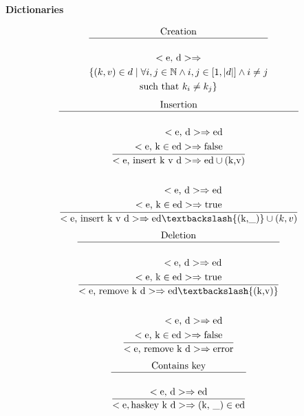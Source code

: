 \documentclass[a4paper, 10pt]{article}
\newcommand{\te}[1]{\text{#1}}
\def\N{\mathbb{N}}
\DeclarePairedDelimiter\abs{\lvert}{\rvert}
\theoremstyle{plain}%
\theoremstyle{definition}
\theoremstyle{remark}
\begin{document}
\textbf{Dictionaries}

\begin{gather*}
	\te{Creation} \\
	\hline \\
	<\te{e, d}> \Rightarrow \\ \{ (k,v) \in d \mid \forall i,j \in \N \wedge i,j \in \left[1, \abs{d}\right] \land i \neq j \\ \text{such that } k_i \neq k_j \}
\end{gather*}
\begin{gather*}
	\te{Insertion} \\
	\hline \\
	\dfrac{ \begin{aligned}
		<\te{e, d}> \Rightarrow \te{ed} \\
		<\te{e, k} \in \te{ed}> \Rightarrow \te{false} \\
	\end{aligned} }{<\te{e, insert k v d}> \Rightarrow \te{ed} \cup (\te{k,v})} \\ \\
	\dfrac{ \begin{aligned}
		<\te{e, d}> \Rightarrow \te{ed} \\
		<\te{e, k} \in \te{ed}> \Rightarrow \te{true}
	\end{aligned}}{<\te{e, insert k v d}> \Rightarrow \te{ed} \textbackslash \{(\te{k,\_})\} \cup (k, v) }
\end{gather*}
\begin{gather*}
	\te{Deletion} \\ \hline \\
	\dfrac{	\begin{aligned}
		<\te{e, d}> \Rightarrow \te{ed} \\
		<\te{e, k} \in \te{ed}> \Rightarrow \te{true}
	\end{aligned}}{<\te{e, remove k d}> \Rightarrow \te{ed} \textbackslash \{(\te{k,v})\}} \\ \\
	\dfrac{	\begin{aligned}
		<\te{e, d}> \Rightarrow \te{ed} \\
		<\te{e, k} \in \te{ed}> \Rightarrow \te{false}
	\end{aligned}}{<\te{e, remove k d}> \Rightarrow \te{error}}
\end{gather*}
\begin{gather*}
	\te{Contains key} \\ \hline \\
	\dfrac{<\te{e, d}> \Rightarrow \te{ed}}{<\te{e}, \te{haskey k d}> \Rightarrow (\te{k, \_}) \in \te{ed}}
\end{gather*}
\end{document}
